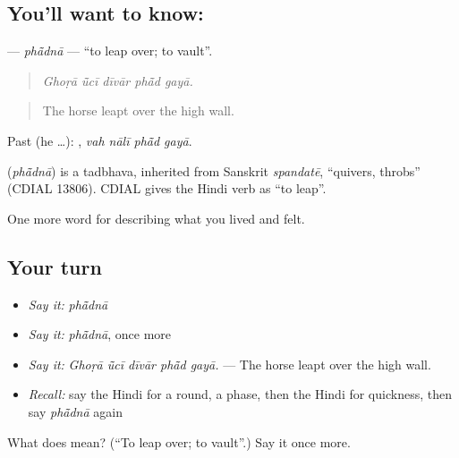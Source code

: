 \subsection*{You'll want to know: }
\textbf{} — \emph{phā̃dnā} — \textquotedblleft{}to leap over; to vault\textquotedblright{}.

\begin{quote}
    
\end{quote}

\begin{quote}
\emph{Ghoṛā ū̃cī dīvār phā̃d gayā.}
\end{quote}

\begin{quote}
The horse leapt over the high wall.
\end{quote}

Past (he …):    , \emph{vah nālī phā̃d gayā}.

\begin{cousinweb}
\textbf{} (\emph{phā̃dnā}) is a tadbhava, inherited from Sanskrit \emph{spandatē}, \textquotedblleft{}quivers, throbs\textquotedblright{} (CDIAL 13806). CDIAL gives the Hindi verb as \textquotedblleft{}to leap\textquotedblright{}.
\end{cousinweb}

\begin{grammarlens}[title={What you've built}]
One more word for describing what you lived and felt.
\end{grammarlens}

\subsection*{Your turn}
\begin{itemize}
\raggedright
  \item \emph{Say it:} \emph{phā̃dnā}
  \item \emph{Say it:} \emph{phā̃dnā}, once more
  \item \emph{Say it:} \emph{Ghoṛā ū̃cī dīvār phā̃d gayā.} — The horse leapt over the high wall.
  \item \emph{Recall:} say the Hindi for a round, a phase, then the Hindi for quickness, then say \emph{phā̃dnā} again
\end{itemize}

\begin{tcolorbox}[breakable,colback=teal!4,colframe=teal!35!black,title={Before you move on}]
What does  mean? (\textquotedblleft{}To leap over; to vault\textquotedblright{}.) Say it once more.
\end{tcolorbox}

